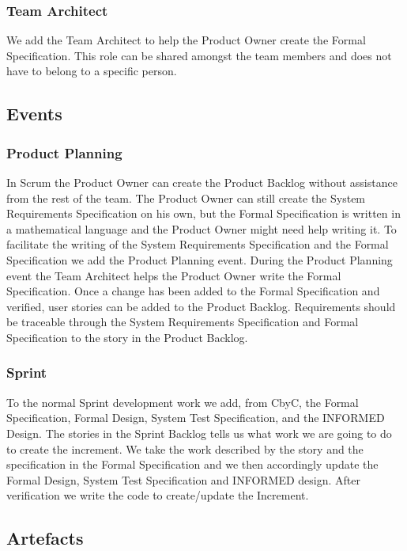\subsubsection{Team Architect}
We add the Team Architect to help the Product Owner create the Formal Specification.
This role can be shared amongst the team members and does not have to belong to a
specific person.

\subsection{Events}

\subsubsection{Product Planning}
In Scrum the Product Owner can create the Product Backlog without assistance
from the rest of the team. The Product Owner can still create the 
System Requirements Specification on his own, but the Formal Specification is
written in a mathematical language and the Product Owner might need help writing
it. To facilitate the writing of the System Requirements Specification and the 
Formal Specification we add the Product Planning event. During the Product Planning 
event the Team Architect helps the Product Owner write the Formal Specification.
Once a change has been added to the Formal Specification and verified, user 
stories can be added to the Product Backlog. Requirements should be traceable 
through the System Requirements Specification and Formal Specification to the story
in the Product Backlog.

\subsubsection{Sprint}
To the normal Sprint development work we add, from CbyC, the Formal Specification,
Formal Design, System Test Specification, and the INFORMED Design. The stories in
the Sprint Backlog tells us what work we are going to do to create the increment. We 
take the work described by the story and the specification in the Formal Specification 
and we then accordingly update the Formal Design, System Test Specification 
and INFORMED design. After verification we write the code to create/update the
Increment.

\subsection{Artefacts}

